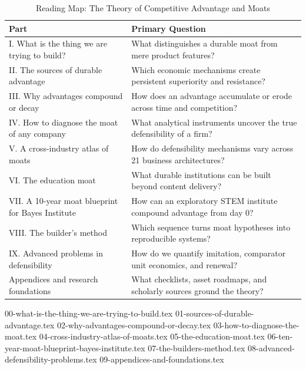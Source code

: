 \begin{table}[t]
\centering
\small
\caption{Reading Map: The Theory of Competitive Advantage and Moats}
\label{tab:ch28_reading_map}
\begin{tabularx}{\textwidth}{l X}
\toprule
\textbf{Part} & \textbf{Primary Question} \\
\midrule
I. What is the thing we are trying to build? & What distinguishes a durable moat from mere product features? \\
II. The sources of durable advantage & Which economic mechanisms create persistent superiority and resistance? \\
III. Why advantages compound or decay & How does an advantage accumulate or erode across time and competition? \\
IV. How to diagnose the moat of any company & What analytical instruments uncover the true defensibility of a firm? \\
V. A cross-industry atlas of moats & How do defensibility mechanisms vary across 21 business architectures? \\
VI. The education moat & What durable institutions can be built beyond content delivery? \\
VII. A 10-year moat blueprint for Bayes Institute & How can an exploratory STEM institute compound advantage from day 0? \\
VIII. The builder's method & Which sequence turns moat hypotheses into reproducible systems? \\
IX. Advanced problems in defensibility & How do we quantify imitation, comparator unit economics, and renewal? \\
Appendices and research foundations & What checklists, asset roadmaps, and scholarly sources ground the theory? \\
\bottomrule
\end{tabularx}
\end{table}

{00-what-is-the-thing-we-are-trying-to-build.tex}
{01-sources-of-durable-advantage.tex}
{02-why-advantages-compound-or-decay.tex}
{03-how-to-diagnose-the-moat.tex}
{04-cross-industry-atlas-of-moats.tex}
{05-the-education-moat.tex}
{06-ten-year-moat-blueprint-bayes-institute.tex}
{07-the-builders-method.tex}
{08-advanced-defensibility-problems.tex}
{09-appendices-and-foundations.tex}
